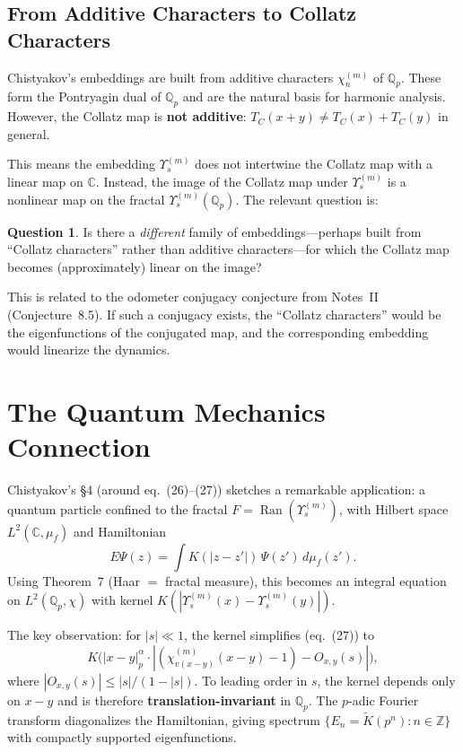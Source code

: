 \documentclass[11pt,a4paper]{article}
\newcommand{\Z}{\mathbb{Z}}
\newcommand{\C}{\mathbb{C}}
\newcommand{\Q}{\mathbb{Q}}
\newcommand{\Qp}{\Q_p}
\DeclareMathOperator{\Ran}{Ran}
\theoremstyle{plain}
\theoremstyle{definition}
\newtheorem{question}[theorem]{Question}
\begin{document}
\subsection{From Additive Characters to Collatz Characters}

Chistyakov's embeddings are built from additive characters $\chi_n^{(m)}$ of $\Qp$. These form the Pontryagin dual of $\Qp$ and are the natural basis for harmonic analysis. However, the Collatz map is \textbf{not additive}: $T_C(x + y) \neq T_C(x) + T_C(y)$ in general.

This means the embedding $\Upsilon_s^{(m)}$ does not intertwine the Collatz map with a linear map on $\C$. Instead, the image of the Collatz map under $\Upsilon_s^{(m)}$ is a nonlinear map on the fractal $\Upsilon_s^{(m)}(\Qp)$. The relevant question is:

\begin{question}
    Is there a \emph{different} family of embeddings---perhaps built from ``Collatz characters'' rather than additive characters---for which the Collatz map becomes (approximately) linear on the image?
\end{question}

This is related to the odometer conjugacy conjecture from Notes~II (Conjecture~8.5). If such a conjugacy exists, the ``Collatz characters'' would be the eigenfunctions of the conjugated map, and the corresponding embedding would linearize the dynamics.


\section{The Quantum Mechanics Connection}\label{sec:quantum}

Chistyakov's \S4 (around eq.~(26)--(27)) sketches a remarkable application: a quantum particle confined to the fractal $F = \Ran(\Upsilon_s^{(m)})$, with Hilbert space $L^2(\C, \mu_f)$ and Hamiltonian
\begin{equation}\label{eq:schrodinger-fractal}
    E\Psi(z) = \int K(|z - z'|)\,\Psi(z')\,d\mu_f(z').
\end{equation}
Using Theorem~7 (Haar $=$ fractal measure), this becomes an integral equation on $L^2(\Qp, \chi)$ with kernel $K(|\Upsilon_s^{(m)}(x) - \Upsilon_s^{(m)}(y)|)$.

The key observation: for $|s| \ll 1$, the kernel simplifies (eq.~(27)) to
\begin{equation}
    K\bigl(|x - y|_p^\alpha \cdot |(\chi_{v(x-y)}^{(m)}(x-y) - 1) - O_{x,y}(s)|\bigr),
\end{equation}
where $|O_{x,y}(s)| \leq |s|/(1 - |s|)$. To leading order in $s$, the kernel depends only on $x - y$ and is therefore \textbf{translation-invariant} in $\Qp$. The $p$-adic Fourier transform diagonalizes the Hamiltonian, giving spectrum $\{E_n = \widetilde{K}(p^n) : n \in \Z\}$ with compactly supported eigenfunctions.
\end{document}
